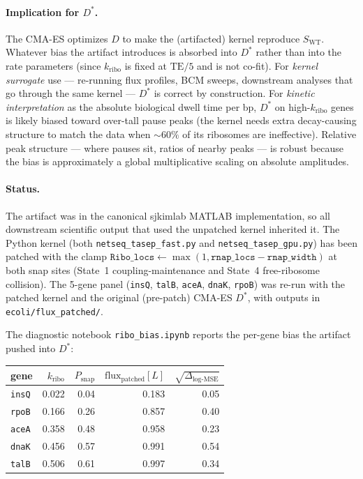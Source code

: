 \documentclass[11pt]{article}
\newcommand{\SWT}{S_{\text{WT}}}
\begin{document}
\paragraph{Implication for $D^*$.} The CMA-ES optimizes $D$ to make
the (artifacted) kernel reproduce $\SWT$. Whatever bias the artifact
introduces is absorbed into $D^*$ rather than into the rate
parameters (since $k_{\text{ribo}}$ is fixed at $\text{TE}/5$ and is
not co-fit). For \emph{kernel surrogate} use --- re-running flux
profiles, BCM sweeps, downstream analyses that go through the same
kernel --- $D^*$ is correct by construction. For \emph{kinetic
interpretation} as the absolute biological dwell time per bp, $D^*$
on high-$k_{\text{ribo}}$ genes is likely biased toward over-tall
pause peaks (the kernel needs extra decay-causing structure to match
the data when $\sim 60\%$ of its ribosomes are ineffective). Relative
peak structure --- where pauses sit, ratios of nearby peaks --- is
robust because the bias is approximately a global multiplicative
scaling on absolute amplitudes.

\paragraph{Status.} The artifact was in the canonical sjkimlab MATLAB
implementation, so all downstream scientific output that used the
unpatched kernel inherited it. The Python kernel (both
\texttt{netseq\_tasep\_fast.py} and \texttt{netseq\_tasep\_gpu.py})
has been patched with the clamp
$\texttt{Ribo\_locs} \leftarrow \max(1, \texttt{rnap\_locs} - \texttt{rnap\_width})$
at both snap sites (State~1 coupling-maintenance and State~4
free-ribosome collision). The 5-gene panel (\texttt{insQ},
\texttt{talB}, \texttt{aceA}, \texttt{dnaK}, \texttt{rpoB}) was
re-run with the patched kernel and the original (pre-patch) CMA-ES
$D^*$, with outputs in \texttt{ecoli/flux\_patched/}.

The diagnostic notebook \texttt{ribo\_bias.ipynb} reports the
per-gene bias the artifact pushed into $D^*$:

\begin{center}
\begin{tabular}{l r r r r}
\hline
gene & $k_{\text{ribo}}$ & $P_{\text{snap}}$ &
$\text{flux}_{\text{patched}}[L]$ & $\sqrt{\Delta_{\log\text{-MSE}}}$ \\
\hline
\texttt{insQ} & 0.022 & 0.04 & 0.183 & 0.05 \\
\texttt{rpoB} & 0.166 & 0.26 & 0.857 & 0.40 \\
\texttt{aceA} & 0.358 & 0.48 & 0.958 & 0.23 \\
\texttt{dnaK} & 0.456 & 0.57 & 0.991 & 0.54 \\
\texttt{talB} & 0.506 & 0.61 & 0.997 & 0.34 \\
\hline
\end{tabular}
\end{center}
\end{document}
